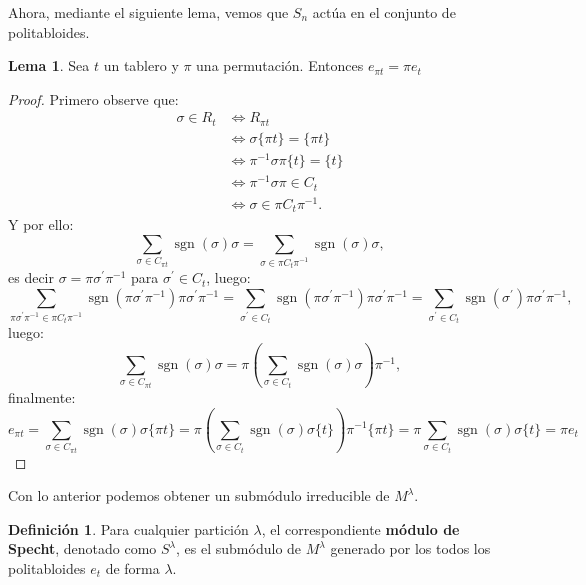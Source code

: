 \documentclass[12pt]{book}
\theoremstyle{definition}
\newtheorem{definition}[theorem]{Definición}
\newtheorem{lemma}[theorem]{Lema}
\newcounter{in}
\newcounter{ini}
\DeclareMathOperator{\sgn}{sgn}
\begin{document}
Ahora, mediante el siguiente lema, vemos que $S_{n}$ actúa en el
conjunto de politabloides.
\begin{lemma}
  \label{lema}
  Sea $t$ un tablero y $\pi$ una permutación. Entonces $e_{\pi t}=\pi e_{t}$
\end{lemma}
\begin{proof}
Primero observe que:
\begin{equation}
\begin{aligned}
\sigma \in R_{t} & \Leftrightarrow R_{\pi t} \\
& \Leftrightarrow \sigma \{ \pi t\} = \{\pi t \} \\
& \Leftrightarrow \pi^{-1} \sigma \pi \{t \} = \{ t \}  \\
& \Leftrightarrow \pi^{-1} \sigma \pi \in C_{t} \\
& \Leftrightarrow  \sigma \in \pi C_{t} \pi^{-1}.
\end{aligned}
\end{equation}
Y por ello:
\begin{equation*}
\sum_{\sigma \in C_{\pi t}}\sgn(\sigma)\sigma = \sum_{\sigma \in \pi C_{t} \pi^{-1} }\sgn(\sigma)\sigma,
\end{equation*}
es decir $\sigma = \pi \sigma^{'} \pi^{-1}$ para $\sigma^{'} \in C_{t}$, luego:
\begin{equation*}
\sum_{\pi \sigma^{'} \pi^{-1} \in \pi C_{t} \pi^{-1} }\sgn(\pi \sigma^{'} \pi^{-1}) \pi \sigma^{'} \pi^{-1} = \sum_{\sigma^{'} \in  C_{t}} \sgn(\pi \sigma^{'} \pi^{-1}) \pi \sigma^{'} \pi^{-1} = \sum_{\sigma^{'} \in  C_{t}} \sgn(\sigma^{'}) \pi \sigma^{'} \pi^{-1},
\end{equation*}
luego:
\begin{equation}
\label{et}
\sum_{\sigma \in C_{\pi t}}\sgn(\sigma)\sigma = \pi (\sum_{\sigma \in  C_{t}} \sgn(\sigma) \sigma) \pi^{-1},
\end{equation}
finalmente:
\begin{equation}
e_{\pi t} = \sum_{\sigma \in C_{\pi t}}\sgn(\sigma)\sigma \{ \pi t \} = \pi (\sum_{\sigma \in C_{t}}\sgn(\sigma)\sigma \{ t \}) \pi^{-1} \{ \pi t \} = \pi \sum_{\sigma \in C_{t}}\sgn(\sigma)\sigma \{ t \} = \pi e_{t}
\end{equation}
\end{proof}
Con lo anterior podemos obtener un submódulo irreducible de $M^{\lambda}$.
\begin{definition}
  Para cualquier partición $\lambda$, el correspondiente
  \textbf{módulo de Specht}, denotado como $S^{\lambda}$, es el submódulo
  de $M^{\lambda}$ generado por los todos los politabloides $e_{t}$ de
  forma $\lambda$.
\end{definition}
\end{document}
